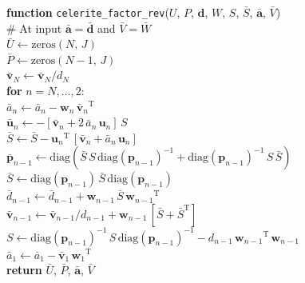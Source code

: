 \documentclass[rnaas]{aastex62}
\newcommand{\T}{\ensuremath{\mathrm{T}}}
\newcommand{\bvec}[1]{{\ensuremath{\boldsymbol{#1}}}}
\begin{document}
\medskip
\begin{minipage}{\linewidth}
\textbf{function} \texttt{celerite\_factor\_rev}($U$, $P$, $\bvec{d}$, $W$,
    $S$, $\bar{S}$, $\bar{\bvec{a}}$, $\bar{V}$) \\
\hspace*{2em}\textsf{\# At input $\bar{\bvec{a}} = \bar{\bvec{d}}$ and
    $\bar{V} = \bar{W}$}\\
\hspace*{2em}$\bar{U} \gets \mathrm{zeros}(N,\,J)$\\
\hspace*{2em}$\bar{P} \gets \mathrm{zeros}(N-1,\,J)$\\
\hspace*{2em}$\bar{\bvec{v}}_N \gets \bar{\bvec{v}}_N / d_N$\\
\hspace*{2em}\textbf{for} $n = N,\ldots,2$:\\
\hspace*{2em}\hspace*{2em}$\bar{a}_n \gets \bar{a}_n -
    \bvec{w}_n\,{\bar{\bvec{v}}_n}^\T$\\
\hspace*{2em}\hspace*{2em}$\bar{\bvec{u}}_n \gets - [\bar{\bvec{v}}_n +
    2\,\bar{a}_n\,\bvec{u}_n]\,S$\\
\hspace*{2em}\hspace*{2em}$\bar{S} \gets \bar{S} -
    {\bvec{u}_n}^\T\,[\bar{\bvec{v}}_n + \bar{a}_n\,\bvec{u}_n]$\\
\hspace*{2em}\hspace*{2em}$\bar{\bvec{p}}_{n-1} \gets \mathrm{diag}(\bar{S}\,S
    \,\mathrm{diag}(\bvec{p}_{n-1})^{-1} + \mathrm{diag}(\bvec{p}_{n-1})^{-1}\,
    S\,\bar{S})$\\
\hspace*{2em}\hspace*{2em}$\bar{S} \gets \mathrm{diag}(\bvec{p}_{n-1})\,
    \bar{S}\,\mathrm{diag}(\bvec{p}_{n-1})$\\
\hspace*{2em}\hspace*{2em}$\bar{d}_{n-1} \gets \bar{d}_{n-1} +
    \bvec{w}_{n-1}\,\bar{S}\,{\bvec{w}_{n-1}}^\T$\\
\hspace*{2em}\hspace*{2em}$\bar{\bvec{v}}_{n-1} \gets \bar{\bvec{v}}_{n-1}
    / d_{n-1} + \bvec{w}_{n-1}\,[\bar{S} + \bar{S}^\T]$\\
\hspace*{2em}\hspace*{2em}$S \gets \mathrm{diag}(\bvec{p}_{n-1})^{-1}\,S\,
    \mathrm{diag}(\bvec{p}_{n-1})^{-1}
    - d_{n-1}\,{\bvec{w}_{n-1}}^\T\,\bvec{w}_{n-1}$\\
\hspace*{2em}$\bar{a}_1 \gets \bar{a}_1 -
    \bar{\bvec{v}}_1\,{\bvec{w}_1}^\T$\\
\hspace*{2em}\textbf{return} $\bar{U}$, $\bar{P}$, $\bar{\bvec{a}}$, $\bar{V}$
\end{minipage}
\medskip
\end{document}
